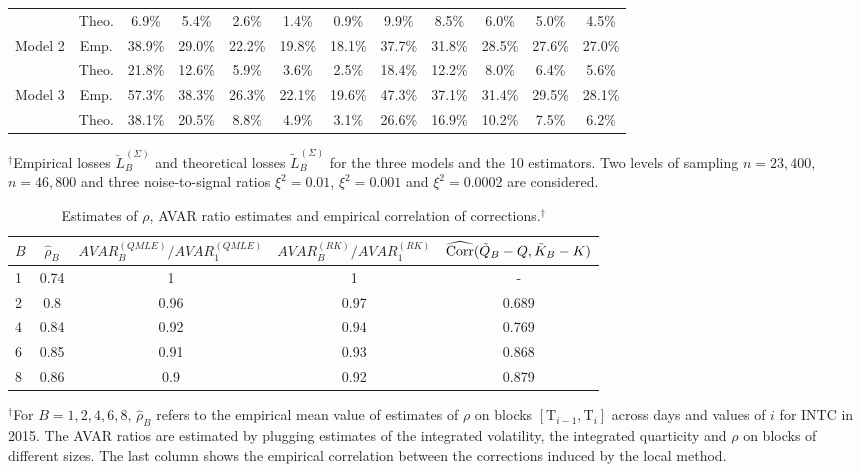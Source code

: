 \documentclass[11pt]{article}
\numberwithin{equation}{section}
\newcommand{\Tau}{\mathrm{T}}
\theoremstyle{plain}
\theoremstyle{remark}
\begin{document}
\begin{table}
{\begin{tabular}{@{}rccccccccccc@{}}
  &Theo. &6.9\%&5.4\%&2.6\%&1.4\%&0.9\%&9.9\%&8.5\%&6.0\%&5.0\%&4.5\%\\
\multirow{2}{*}{Model 2} & Emp. &38.9\%&29.0\%&22.2\%&19.8\%&18.1\%&37.7\%&31.8\%&28.5\%&27.6\%&27.0\%\\
  &Theo. &21.8\%&12.6\%&5.9\%&3.6\%&2.5\%&18.4\%&12.2\%&8.0\%&6.4\%&5.6\%\\
\multirow{2}{*}{Model 3} & Emp. &57.3\%&38.3\%&26.3\%&22.1\%&19.6\%&47.3\%&37.1\%&31.4\%&29.5\%&28.1\%\\
  &Theo. &38.1\%&20.5\%&8.8\%&4.9\%&3.1\%&26.6\%&16.9\%&10.2\%&7.5\%&6.2\%\\
\bottomrule
\end{tabular}}
\scriptsize $^\dag$Empirical losses $\breve{L}_B^{(\Sigma)}$ and theoretical losses $\tilde{L}_B^{(\Sigma)}$ for the three models and the 10 estimators. Two levels of sampling $n = 23,400$, $n = 46,800$ and three noise-to-signal ratios $\xi^2 = 0.01$, $\xi^2 = 0.001$ and $\xi^2=0.0002$ are considered.
\end{table}

\begin{table}
\centering
\caption{Estimates of $\rho$, AVAR ratio estimates and empirical correlation of corrections.$^\dag$}
\label{tableRho2}
\begin{tabular}{lcccc}
\toprule
\toprule
$B$   & $\widehat{\rho}_{B}$ & $AVAR_B^{(QMLE)}/AVAR_1^{(QMLE)}$ &$AVAR_B^{(RK)}/AVAR_1^{(RK)}$& $\widehat{\textnormal{Corr}}(\tilde{Q}_B - Q, \tilde{K}_B - K)$ \\
\toprule
1 & 0.74  & 1  & 1 &  -\\
2 & 0.8  & 0.96  & 0.97 & 0.689\\
4 & 0.84  & 0.92  & 0.94 & 0.769\\
6 & 0.85  & 0.91  & 0.93 & 0.868\\
8 & 0.86  & 0.9  & 0.92 & 0.879\\

\bottomrule
\end{tabular}

\scriptsize $^\dag$For $B = 1,2,4,6,8$, $\widehat{\rho}_B$ refers to the empirical mean value of estimates of $\rho$ on blocks $[\Tau_{i-1}, \Tau_i]$ across days and values of $i$ for INTC in 2015. The AVAR ratios are estimated by plugging estimates of the integrated volatility, the integrated quarticity and $\rho$ on blocks of different sizes. The last column shows the empirical correlation between the corrections induced by the local method.    
\end{table}
\end{document}
